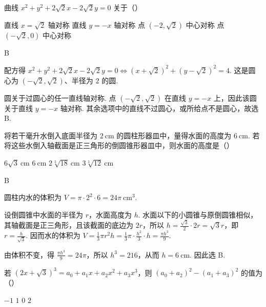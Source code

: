\documentclass[UTF8,a4paper,oneside,11pt]{ctexbook}
\begin{document}
\begin{problem}
曲线 \(x^{2} + y^{2} + 2\sqrt{2} x - 2\sqrt{2} y = 0\) 关于（\quad）

\choices
    {直线 \(x = \sqrt{2}\) 轴对称}
    {直线 \(y = -x \) 轴对称}
    {点 \((-2, \sqrt{2})\) 中心对称}
    {点 \((- \sqrt{2}, 0)\) 中心对称}
\end{problem}

\begin{answer}
B
\end{answer}

\begin{solution}
配方得
\(x^2+y^2+2\sqrt2x-2\sqrt2y=0\Longleftrightarrow (x+\sqrt2)^2+(y-\sqrt2)^2=4\).
这是圆心为 \((-\sqrt2,\sqrt2)\)、半径为 \(2\) 的圆.

圆关于过圆心的任一直线轴对称. 点 \((-\sqrt2,\sqrt2)\) 在直线 \(y=-x\) 上，因此该圆关于直线 \(y=-x\) 轴对称. 其余选项中的直线不过圆心，或所给点不是圆心，故选 B.
\end{solution}

\begin{problem}
将若干毫升水倒入底面半径为 \(2\mathrm{~cm}\) 的圆柱形器皿中，量得水面的高度为 \(6\mathrm{~cm}\). 若将这些水倒入轴截面是正三角形的倒圆锥形器皿中，则水面的高度是（\quad）

\choices
    {\(6\sqrt{3}\mathrm{~cm}\)}
    {\(6\mathrm{~cm}\)}
    {\(2\sqrt[3]{18}\mathrm{~cm}\)}
    {\(3\sqrt[3]{12}\mathrm{~cm}\)}
\end{problem}

\begin{answer}
B
\end{answer}

\begin{solution}
圆柱内水的体积为
\(V=\pi\cdot2^2\cdot6=24\pi\ \mathrm{cm}^3\).

设倒圆锥中水面的半径为 \(r\)，水面高度为 \(h\). 水面以下的小圆锥与原倒圆锥相似，其轴截面是正三角形，且该截面的底边为 \(2r\)，所以 \(h=\frac{\sqrt3}{2}\cdot2r=\sqrt3r\)，即 \(r=\frac{h}{\sqrt3}\). 因而水的体积为
\(V=\frac13\pi r^2h=\frac13\pi\cdot\frac{h^2}{3}\cdot h=\frac{\pi h^3}{9}\).

由体积不变，得 \(\frac{\pi h^3}{9}=24\pi\)，所以 \(h^3=216\)，从而 \(h=6\ \mathrm{cm}\). 因此选 B.
\end{solution}

\begin{problem}
若 \((2x + \sqrt{3})^3 = a_0 + a_1x + a_2x^2 + a_3x^3\)，则 \((a_0 + a_2)^2 - (a_1 + a_3)^2\) 的值为（\quad）

\choices
    {\(-1\)}
    {\(1\)}
    {\(0\)}
    {\(2\)}
\end{problem}
\end{document}
